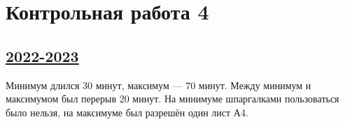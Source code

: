 
\newpage
\thispagestyle{empty}
\section{Контрольная работа 4}


\subsection[2022-2023]{\hyperref[sec:sol_kr_04_2022_2023]{2022-2023}}
\label{sec:kr_04_2022_2023}

Минимум длился 30 минут, максимум — 70 минут. Между минимум и максимумом был перерыв 20 минут. 
На минимуме шпаргалками пользоваться было нельзя, на максимуме был разрешён один лист А4.

